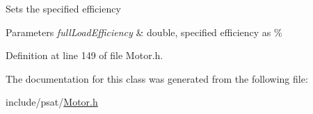 Sets the specified efficiency 
\begin{DoxyParams}{Parameters}
{\em full\+Load\+Efficiency} & double, specified efficiency as \% \\
\hline
\end{DoxyParams}


Definition at line 149 of file Motor.\+h.



The documentation for this class was generated from the following file\+:\begin{DoxyCompactItemize}
\item 
include/psat/\hyperlink{_motor_8h}{Motor.\+h}\end{DoxyCompactItemize}
